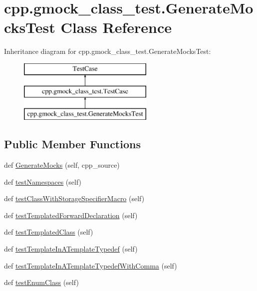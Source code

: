 \hypertarget{classcpp_1_1gmock__class__test_1_1_generate_mocks_test}{}\section{cpp.\+gmock\+\_\+class\+\_\+test.\+Generate\+Mocks\+Test Class Reference}
\label{classcpp_1_1gmock__class__test_1_1_generate_mocks_test}
Inheritance diagram for cpp.\+gmock\+\_\+class\+\_\+test.\+Generate\+Mocks\+Test\+:\begin{figure}[H]
\begin{center}
\leavevmode
\includegraphics[height=3.000000cm]{d6/d25/classcpp_1_1gmock__class__test_1_1_generate_mocks_test}
\end{center}
\end{figure}
\subsection*{Public Member Functions}
\begin{DoxyCompactItemize}
\item 
def \mbox{\hyperlink{classcpp_1_1gmock__class__test_1_1_generate_mocks_test_afdce6749dca14c1aa90762d389d92c87}{Generate\+Mocks}} (self, cpp\+\_\+source)
\item 
def \mbox{\hyperlink{classcpp_1_1gmock__class__test_1_1_generate_mocks_test_a706812da9e8f79a689c707b4032db2d2}{test\+Namespaces}} (self)
\item 
def \mbox{\hyperlink{classcpp_1_1gmock__class__test_1_1_generate_mocks_test_aba1ab8ae8a897ea9c22a47bcd1524254}{test\+Class\+With\+Storage\+Specifier\+Macro}} (self)
\item 
def \mbox{\hyperlink{classcpp_1_1gmock__class__test_1_1_generate_mocks_test_a18cb0f03ecd4e54d0f787694c1513731}{test\+Templated\+Forward\+Declaration}} (self)
\item 
def \mbox{\hyperlink{classcpp_1_1gmock__class__test_1_1_generate_mocks_test_a4098c99b66f0cbea7be9e66352a20f4d}{test\+Templated\+Class}} (self)
\item 
def \mbox{\hyperlink{classcpp_1_1gmock__class__test_1_1_generate_mocks_test_a32a2840352d970c631d7be1b6d1970e6}{test\+Template\+In\+A\+Template\+Typedef}} (self)
\item 
def \mbox{\hyperlink{classcpp_1_1gmock__class__test_1_1_generate_mocks_test_a67d1336b8782257fcfcdbda8c8d4f794}{test\+Template\+In\+A\+Template\+Typedef\+With\+Comma}} (self)
\item 
def \mbox{\hyperlink{classcpp_1_1gmock__class__test_1_1_generate_mocks_test_a2bbddbe36e49edf3cb9116c3dd0fe814}{test\+Enum\+Class}} (self)
\end{DoxyCompactItemize}


